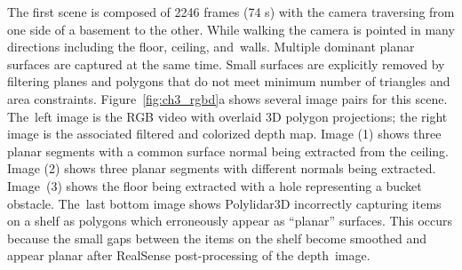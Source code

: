 The first scene is composed of 2246 frames (74 s) with the camera traversing from one side of a basement to the other. While walking the camera is pointed in many directions including the floor, ceiling, and~walls.  Multiple dominant planar surfaces are captured at the same time.  Small surfaces are explicitly removed by filtering planes and polygons that do not meet minimum number of triangles and area constraints. Figure~\ref{fig:ch3_rgbd}a shows several image pairs for this scene. The~left image is the RGB video with overlaid 3D polygon projections; the right image is the associated filtered and colorized depth map. Image (1) shows three planar segments with a common surface normal being extracted from the ceiling. Image (2) shows three planar segments with different normals being extracted. Image~(3) shows the floor being extracted with a hole representing a bucket obstacle. The~last bottom image shows Polylidar3D incorrectly capturing items on a shelf as polygons which erroneously appear as ``planar'' surfaces. This occurs because the small gaps between the items on the shelf become smoothed and appear planar after RealSense post-processing of the depth~image. 

